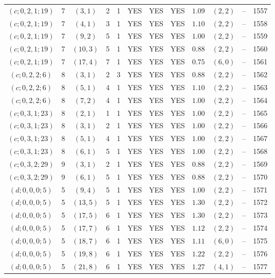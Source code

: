 \begin{longtable}{|c|c|c|c|c|c|c|c|c|c|c|c|}
$(c;0,2,1;19)$ & 7 & $(3,1)$ & 2 & 1 & YES & YES & YES & $1.09$ & $(2,2)$ & -- & 1557\\
$(c;0,2,1;19)$ & 7 & $(4,1)$ & 3 & 1 & YES & YES & YES & $1.10$ & $(2,2)$ & -- & 1558\\
$(c;0,2,1;19)$ & 7 & $(9,2)$ & 5 & 1 & YES & YES & YES & $1.00$ & $(2,2)$ & -- & 1559\\
$(c;0,2,1;19)$ & 7 & $(10,3)$ & 5 & 1 & YES & YES & YES & $0.88$ & $(2,2)$ & -- & 1560\\
$(c;0,2,1;19)$ & 7 & $(17,4)$ & 7 & 1 & YES & YES & YES & $0.75$ & $(6,0)$ & -- & 1561\\
$(c;0,2,2;6)$ & 8 & $(3,1)$ & 2 & 3 & YES & YES & YES & $0.88$ & $(2,2)$ & -- & 1562\\
$(c;0,2,2;6)$ & 8 & $(5,1)$ & 4 & 1 & YES & YES & YES & $1.10$ & $(2,2)$ & -- & 1563\\
$(c;0,2,2;6)$ & 8 & $(7,2)$ & 4 & 1 & YES & YES & YES & $1.00$ & $(2,2)$ & -- & 1564\\
$(c;0,3,1;23)$ & 8 & $(2,1)$ & 1 & 1 & YES & YES & YES & $1.00$ & $(2,2)$ & -- & 1565\\
$(c;0,3,1;23)$ & 8 & $(3,1)$ & 2 & 1 & YES & YES & YES & $1.00$ & $(2,2)$ & -- & 1566\\
$(c;0,3,1;23)$ & 8 & $(5,1)$ & 4 & 1 & YES & YES & YES & $1.00$ & $(2,2)$ & -- & 1567\\
$(c;0,3,1;23)$ & 8 & $(6,1)$ & 5 & 1 & YES & YES & YES & $1.00$ & $(2,2)$ & -- & 1568\\
$(c;0,3,2;29)$ & 9 & $(3,1)$ & 2 & 1 & YES & YES & YES & $0.88$ & $(2,2)$ & -- & 1569\\
$(c;0,3,2;29)$ & 9 & $(6,1)$ & 5 & 1 & YES & YES & YES & $0.88$ & $(2,2)$ & -- & 1570\\
$(d;0,0,0;5)$ & 5 & $(9,4)$ & 5 & 1 & YES & YES & YES & $1.00$ & $(2,2)$ & -- & 1571\\
$(d;0,0,0;5)$ & 5 & $(13,5)$ & 5 & 1 & YES & YES & YES & $1.30$ & $(2,2)$ & -- & 1572\\
$(d;0,0,0;5)$ & 5 & $(17,5)$ & 6 & 1 & YES & YES & YES & $1.30$ & $(2,2)$ & -- & 1573\\
$(d;0,0,0;5)$ & 5 & $(17,7)$ & 6 & 1 & YES & YES & YES & $1.12$ & $(2,2)$ & -- & 1574\\
$(d;0,0,0;5)$ & 5 & $(18,7)$ & 6 & 1 & YES & YES & YES & $1.11$ & $(6,0)$ & -- & 1575\\
$(d;0,0,0;5)$ & 5 & $(19,8)$ & 6 & 1 & YES & YES & YES & $1.22$ & $(2,2)$ & -- & 1576\\
$(d;0,0,0;5)$ & 5 & $(21,8)$ & 6 & 1 & YES & YES & YES & $1.27$ & $(4,1)$ & -- & 1577\\

\end{longtable}
